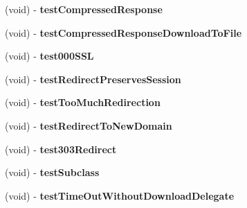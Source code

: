 \begin{DoxyCompactItemize}
\item 
\hypertarget{interface_a_s_i_h_t_t_p_request_tests_ae884e3724fa16e86e2c9f202fafb0832}{
(void) -\/ {\bfseries test\-Compressed\-Response}}
\label{interface_a_s_i_h_t_t_p_request_tests_ae884e3724fa16e86e2c9f202fafb0832}

\item 
\hypertarget{interface_a_s_i_h_t_t_p_request_tests_ad9fe5125c3c071c35369d0df17222250}{
(void) -\/ {\bfseries test\-Compressed\-Response\-Download\-To\-File}}
\label{interface_a_s_i_h_t_t_p_request_tests_ad9fe5125c3c071c35369d0df17222250}

\item 
\hypertarget{interface_a_s_i_h_t_t_p_request_tests_a91af84b41f3a46f64d16095adb340214}{
(void) -\/ {\bfseries test000\-S\-S\-L}}
\label{interface_a_s_i_h_t_t_p_request_tests_a91af84b41f3a46f64d16095adb340214}

\item 
\hypertarget{interface_a_s_i_h_t_t_p_request_tests_a3132c64a767dc4789eedb611544874b7}{
(void) -\/ {\bfseries test\-Redirect\-Preserves\-Session}}
\label{interface_a_s_i_h_t_t_p_request_tests_a3132c64a767dc4789eedb611544874b7}

\item 
\hypertarget{interface_a_s_i_h_t_t_p_request_tests_abdde777c6d2c53c38bbbd414f01ab11c}{
(void) -\/ {\bfseries test\-Too\-Much\-Redirection}}
\label{interface_a_s_i_h_t_t_p_request_tests_abdde777c6d2c53c38bbbd414f01ab11c}

\item 
\hypertarget{interface_a_s_i_h_t_t_p_request_tests_a0e46e6d0e9b2075145255c89cb0f23ae}{
(void) -\/ {\bfseries test\-Redirect\-To\-New\-Domain}}
\label{interface_a_s_i_h_t_t_p_request_tests_a0e46e6d0e9b2075145255c89cb0f23ae}

\item 
\hypertarget{interface_a_s_i_h_t_t_p_request_tests_a486f80b7859c2c3ea72e06a28fdcf789}{
(void) -\/ {\bfseries test303\-Redirect}}
\label{interface_a_s_i_h_t_t_p_request_tests_a486f80b7859c2c3ea72e06a28fdcf789}

\item 
\hypertarget{interface_a_s_i_h_t_t_p_request_tests_aeb6e4b4f2fc9f3a74b3cd2a6c42341d5}{
(void) -\/ {\bfseries test\-Subclass}}
\label{interface_a_s_i_h_t_t_p_request_tests_aeb6e4b4f2fc9f3a74b3cd2a6c42341d5}

\item 
\hypertarget{interface_a_s_i_h_t_t_p_request_tests_ae19beb94bca46a1dcb81e4729dc89f2f}{
(void) -\/ {\bfseries test\-Time\-Out\-Without\-Download\-Delegate}}
\label{interface_a_s_i_h_t_t_p_request_tests_ae19beb94bca46a1dcb81e4729dc89f2f}


\end{DoxyCompactItemize}
